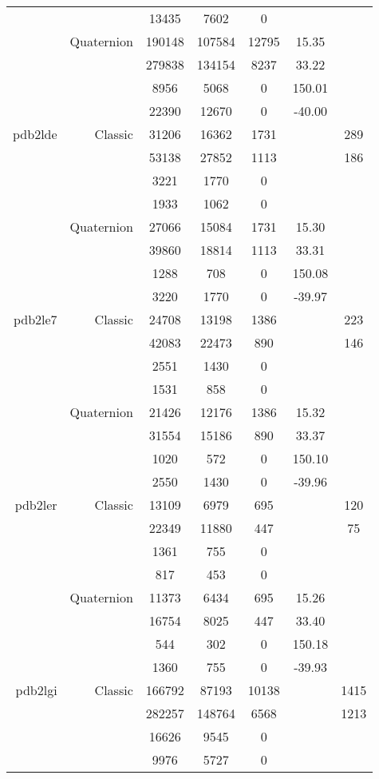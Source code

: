 \begin{xltabular}{\textwidth}{r|rcccSc}
& & 13435 & 7602 & 0 & & \\
& Quaternion & 190148 & 107584 & 12795 & 15.35 & \\
& & 279838 & 134154 & 8237 & 33.22 & \\
& & 8956 & 5068 & 0 & 150.01 & \\
& & 22390 & 12670 & 0 & -40.00 & \\ \addlinespace
pdb2lde & Classic & 31206 & 16362 & 1731 & & 289 \\
& & 53138 & 27852 & 1113 & & 186 \\
& & 3221 & 1770 & 0 & & \\
& & 1933 & 1062 & 0 & & \\
& Quaternion & 27066 & 15084 & 1731 & 15.30 & \\
& & 39860 & 18814 & 1113 & 33.31 & \\
& & 1288 & 708 & 0 & 150.08 & \\
& & 3220 & 1770 & 0 & -39.97 & \\ \addlinespace
pdb2le7 & Classic & 24708 & 13198 & 1386 & & 223 \\
& & 42083 & 22473 & 890 & & 146 \\
& & 2551 & 1430 & 0 & & \\
& & 1531 & 858 & 0 & & \\
& Quaternion & 21426 & 12176 & 1386 & 15.32 & \\
& & 31554 & 15186 & 890 & 33.37 & \\
& & 1020 & 572 & 0 & 150.10 & \\
& & 2550 & 1430 & 0 & -39.96 & \\ \addlinespace
pdb2ler & Classic & 13109 & 6979 & 695 & & 120 \\
& & 22349 & 11880 & 447 & & 75 \\
& & 1361 & 755 & 0 & & \\
& & 817 & 453 & 0 & & \\
& Quaternion & 11373 & 6434 & 695 & 15.26 & \\
& & 16754 & 8025 & 447 & 33.40 & \\
& & 544 & 302 & 0 & 150.18 & \\
& & 1360 & 755 & 0 & -39.93 & \\ \addlinespace
pdb2lgi & Classic & 166792 & 87193 & 10138 & & 1415 \\
& & 282257 & 148764 & 6568 & & 1213 \\
& & 16626 & 9545 & 0 & & \\
& & 9976 & 5727 & 0 & & \\

\end{xltabular}
